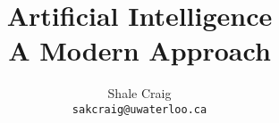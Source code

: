 \ifdefined\isphone
  
\else
  
\fi




\title{Artificial Intelligence \\ A Modern Approach}

\author{
    Shale Craig\\
    \texttt{sakcraig@uwaterloo.ca}
}

\maketitle

\tableofcontents




